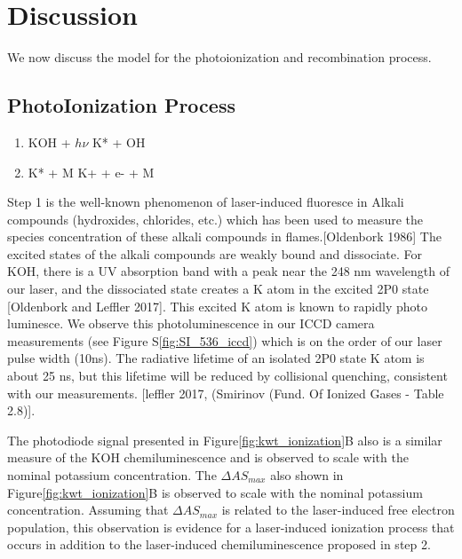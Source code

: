 \section{Discussion}

We now discuss the model for the photoionization and recombination process. 

\subsection{PhotoIonization Process}

\begin{enumerate}
\item KOH + $h\nu$ \rightarrow K* + OH
\item K* + M \rightarrow K+ + e- + M
\end{enumerate}

Step 1 is the well-known phenomenon of laser-induced fluoresce in Alkali compounds (hydroxides, chlorides, etc.) which has been used to measure the species concentration of these alkali compounds in flames.[Oldenbork 1986] The excited states of the alkali compounds are weakly bound and dissociate. For KOH, there is a UV absorption band with a peak near the 248 nm wavelength of our laser, and the dissociated state creates a K atom in the excited 2P0 state [Oldenbork and Leffler 2017]. This excited K atom is known to rapidly photo luminesce. We observe this photoluminescence in our ICCD camera measurements (see Figure S\ref*{fig:SI_536_iccd}) which is on the order of our laser pulse width (10ns). The radiative lifetime of an isolated 2P0 state K atom is about 25 ns, but this lifetime will be reduced by collisional quenching, consistent with our measurements. [leffler 2017, (Smirinov (Fund. Of Ionized Gases - Table 2.8)]. 

The photodiode signal presented in Figure\ref{fig:kwt_ionization}B also is a similar measure of the KOH chemiluminescence and is observed to scale with the nominal potassium concentration. The $\Delta AS_{max}$ also shown in Figure\ref{fig:kwt_ionization}B is observed to scale with the nominal potassium concentration. Assuming that $\Delta AS_{max}$ is related to the laser-induced free electron population, this observation is evidence for a laser-induced ionization process that occurs in addition to the laser-induced chemiluminescence proposed in step 2. 

